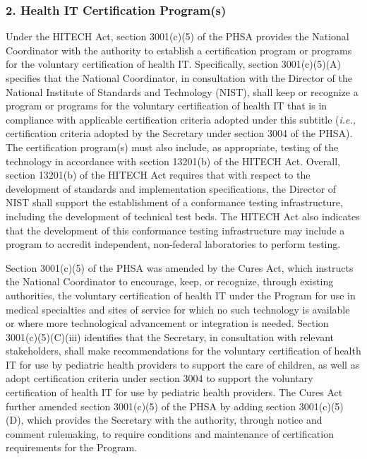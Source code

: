 \documentclass[twoside,11pt]{article}
\begin{document}
          \subsubsection{2. Health IT Certification Program(s)}


          Under the HITECH Act, section 3001(c)(5) of the PHSA provides the National Coordinator with the authority to establish a certification program or programs for the voluntary certification of health IT. Specifically, section 3001(c)(5)(A) specifies that the National Coordinator, in consultation with the Director of the National Institute of Standards and Technology (NIST), shall keep or recognize a program or programs for the voluntary certification of health IT that is in compliance with applicable certification criteria adopted under this subtitle (\emph{i.e.,} certification criteria adopted by the Secretary under section 3004 of the PHSA). The certification program(s) must also include, as appropriate, testing of the technology in accordance with section 13201(b) of the HITECH Act. Overall, section 13201(b) of the HITECH Act requires that with respect to the development of standards and implementation specifications, the Director of NIST shall support the establishment of a conformance testing infrastructure, including the development of technical test beds. The HITECH Act also indicates that the development of this conformance testing infrastructure may include a program to accredit independent, non-federal laboratories to perform testing.


          Section 3001(c)(5) of the PHSA was amended by the Cures Act, which instructs the National Coordinator to encourage, keep, or recognize, through existing authorities, the voluntary certification of health IT under the Program for use in medical specialties and sites of service for which no such technology is available or where more technological advancement or integration is needed. Section 3001(c)(5)(C)(iii) identifies that the Secretary, in consultation with relevant stakeholders, shall make recommendations for the voluntary certification of health IT for use by pediatric health providers to support the care of children, as well as adopt certification criteria under section 3004 to support the voluntary certification of health IT for use by pediatric health providers. The Cures Act further amended section 3001(c)(5) of the PHSA by adding section 3001(c)(5)(D), which provides the Secretary with the authority, through notice and comment rulemaking, to require conditions and maintenance of certification requirements for the Program.
\end{document}
